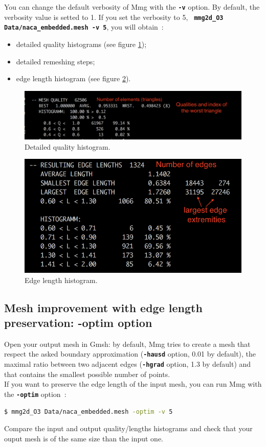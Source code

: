 \documentclass{article}
\newcommand{\ttb}[1]{\texttt{\textbf{#1}}}
\begin{document}
You can change the default verbosity of Mmg with the \ttb{-v}
option. By default, the verbosity value is setted to 1. If you set the
verbosity to 5, \ttb{ mmg2d\_O3 Data/naca\_embedded.mesh -v 5}, you will obtain~:
\begin{itemize}
\item detailed quality histograms (see figure \ref{qual_histo});
\item detailed remeshing steps;
\item edge length histogram (see figure \ref{edge_histo}).
\end{itemize}

\begin{figure}
\centering
\includegraphics[width=0.8\linewidth]{qual_histo}
\caption{\label{qual_histo}
Detailed quality histogram.}
\end{figure}

\begin{figure}
\centering
\includegraphics[width=0.8\linewidth]{edge_histo}
\caption{\label{edge_histo}
Edge length histogram.}
\end{figure}

\subsection{Mesh improvement with edge length preservation: -optim option}
Open your output mesh in Gmsh: by default, Mmg tries to create a mesh
that respect the asked boundary approximation (\ttb{-hausd} option,
0.01 by default), the maximal ratio between two adjacent edges
(\ttb{-hgrad} option, 1.3 by default) and that contains the smallest
possible number of points.\\ If
you want to preserve the edge length of the input mesh, you can run Mmg with
the \ttb{-optim} option~:
\begin{lstlisting}[language=bash]
$ mmg2d_O3 Data/naca_embedded.mesh -optim -v 5
\end{lstlisting}
Compare the input and output quality/lengths histograms and check that
your ouput mesh is of the same size than the input one.\\
\end{document}
